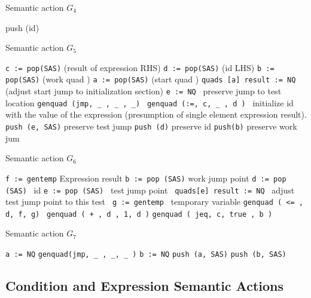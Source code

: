 \documentclass[11pt]{article}
\begin{document}
\begin{algorithm}
\caption{ Semantic action $G_4$}
\label{alg:G4}
\begin{algorithmic}
\STATE push (id)
\end{algorithmic}
\end{algorithm}


\begin{algorithm}
\caption{ Semantic action $G_5$}
\label{alg:g5}
\begin{algorithmic}
\STATE \texttt {c := pop(SAS)} (result of expression RHS)
\STATE \texttt{d := pop(SAS)} (id LHS)
\STATE \texttt{b := pop(SAS)} (work quad )
\STATE \texttt{a := pop(SAS)} (start quad )
\STATE \texttt {quads [a] result := NQ }  (adjust start jump to initialization section)
\STATE \texttt {e := NQ }   preserve jump to test location
\STATE \texttt {genquad (jmp, \_ , \_ , \_) }
\STATE \texttt {genquad (:=, c, \_ , d ) }   initialize id with the value of the expression (presumption of single element expression result).  
\STATE \texttt {push (e, SAS)} preserve test jump
\STATE \texttt{push (d)}  preserve id
\STATE \texttt{push(b)}  preserve work jum
\end{algorithmic}
\end{algorithm}

\begin{algorithm}
\caption{ Semantic action $G_6$}
\label{alg:g6}
\begin{algorithmic}
\STATE \texttt{f  := gentemp}  Expression result
\STATE \texttt{b := pop (SAS)}   work jump point 
\STATE \texttt {d := pop (SAS) }  id 
\STATE \texttt {e := pop (SAS) }  test jump point
\STATE \texttt { quads[e] result := NQ }  adjust test jump point to this test
\STATE \texttt { g := gentemp }  temporary variable 
\STATE \texttt {genquad ( <= , d, f, g)  }
\STATE \texttt {genquad ( + , d , 1, d )}
\STATE \texttt {genquad ( jeq, c, true , b )}
\end{algorithmic}
\end{algorithm}
 
 \begin{algorithm}
\caption{ Semantic action $G_7$}
\label{alg:g7}
\begin{algorithmic}
 \STATE \texttt{a := NQ}
 \STATE \texttt{genquad(jmp, \_ , \_, \_ )}
 \STATE \texttt{b := NQ}
 \STATE \texttt{push (a, SAS)}
 \STATE \texttt{push (b, SAS)}
\end{algorithmic}
\end{algorithm}


\newpage
\subsection {Condition and Expression Semantic Actions}
\end{document}
